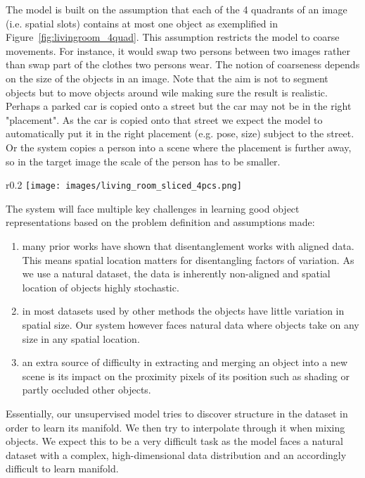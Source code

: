 \documentclass[12pt,a4paper]{article}
\begin{document}
The model is built on the assumption that each of the 4 quadrants of an image (i.e. spatial slots) contains at most one object as exemplified in Figure~\ref{fig:livingroom_4quad}. This assumption restricts the model to coarse movements. For instance, it would swap two persons between two images rather than swap part of the clothes two persons wear. The notion of coarseness depends on the size of the objects in an image. Note that the aim is not to segment objects but to move objects around wile making sure the result is realistic. Perhaps a parked car is copied onto a street but the car may not be in the right "placement". As the car is copied onto that street we expect the model to automatically put it in the right placement (e.g. pose, size) subject to the street. Or the system copies a person into a scene where the placement is further away, so in the target image the scale of the person has to be smaller.

\begin{wrapfigure}{r}{0.2\textwidth}
\texttt{[image: images/living\_room\_sliced\_4pcs.png]} 
\caption{4 quadrants.} %
\label{fig:livingroom_4quad}
\end{wrapfigure}

The system will face multiple key challenges in learning good object representations based on the problem definition and assumptions made:
\begin{enumerate}
  \item many prior works have shown that disentanglement works with aligned data. This means spatial location matters for disentangling factors of variation. As we use a natural dataset, the data is inherently non-aligned and spatial location of objects highly stochastic.
  \item  in most datasets used by other methods the objects have little variation in spatial size. Our system however faces natural data where objects take on any size in any spatial location.
  \item an extra source of difficulty in extracting and merging an object into a new scene is its impact on the proximity pixels of its position such as shading or partly occluded other objects.
\end{enumerate}
Essentially, our unsupervised model tries to discover structure in the dataset in order to learn its manifold. We then try to interpolate through it when mixing objects. We expect this to be a very difficult task as the model faces a natural dataset with a complex, high-dimensional data distribution and an accordingly difficult to learn manifold. 
\end{document}
